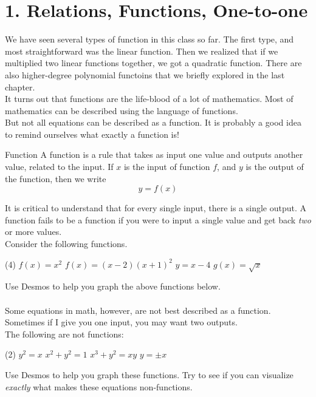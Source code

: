 \documentclass[12pt,fleqn]{book}
\begin{document}
\chapter{1. Relations, Functions, One-to-one}
We have seen several types of function in this class so far.  The first type, and most straightforward was the linear function.  Then we realized that if we multiplied two linear functions together, we got a quadratic function.  There are also higher-degree polynomial functoins that we briefly explored in the last chapter.
\\[1em]
It turns out that functions are the life-blood of a lot of mathematics.  Most of mathematics can be described using the language of functions.
\\[1em]
But not all equations can be described as a function.  It is probably a  good idea to remind ourselves what exactly a function is!
\begin{defn}{Function}{}
A function is a rule that takes as input one value and outputs another value, related to the input.  If $x$ is the input of function $f$, and $y$ is the output of the function, then we write
\[
    y=f(x)
\]
\end{defn}
It is critical to understand that for every single input, there is a single output.  A function fails to be a function if you were to input a single value and get back \emph{two} or more values.
\\[1em]
Consider the following functions.
\begin{tasks}(4)
    \task
    $f(x)=x^2$
    \task
    $f(x)=(x-2)(x+1)^2$
    \task
    $y=x-4$
    \task
    $g(x)=\sqrt x$
\end{tasks}
Use Desmos to help you graph the above functions below.
\\[1em]
\\[1em]
Some equations in math, however, are not best described as a function.  Sometimes if I give you one input, you may want two outputs.
\\[1em]
The following are not functions:
\begin{tasks}(2)
    \task
    $y^2=x$
    \task
    $x^2+y^2=1$
    \task
    $x^3+y^2=xy$
    \task
    $y=\pm x$
\end{tasks}
Use Desmos to help you graph these functions.  Try to see if you can visualize \emph{exactly} what makes these equations non-functions.
\\[1em]
\end{document}
